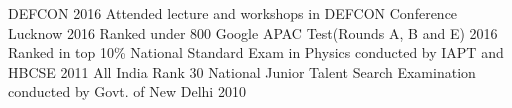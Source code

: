 \begin{cvhonors}
  \cvhonor
    {DEFCON 2016}
    {Attended lecture and workshops in DEFCON Conference Lucknow}
    {}
    {2016}
  \cvhonor
    {Ranked under 800}
    {Google APAC Test(Rounds A, B and E)}
    {}
    {2016}
  \cvhonor
    {Ranked in top 10\%}
    {National Standard Exam in Physics conducted by IAPT and HBCSE}
    {}
    {2011}
  \cvhonor
    {All India Rank 30}
    {National Junior Talent Search Examination conducted by Govt. of New Delhi}
    {}
    {2010}
\end{cvhonors}

